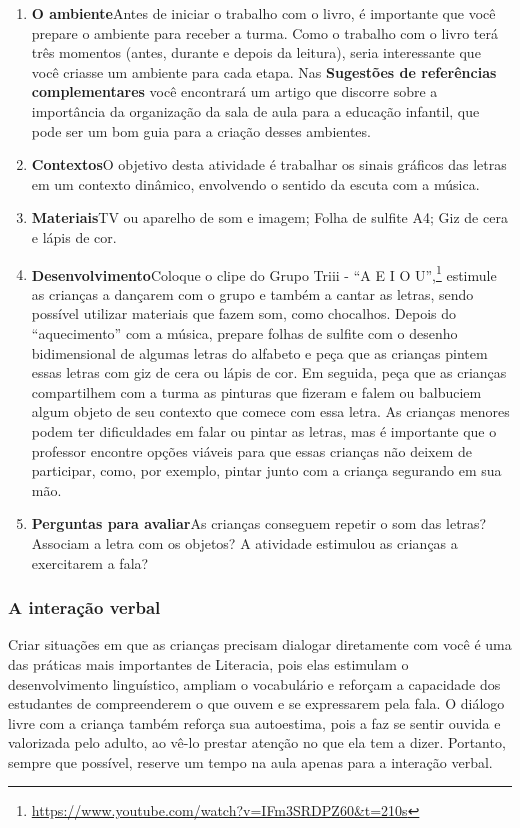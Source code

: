 \documentclass[11pt]{extarticle}
\begin{document}
\begin{enumerate}
\item \textbf{O ambiente}\quad Antes de iniciar o trabalho com o livro, é importante que você 
prepare o ambiente para receber a turma. Como o trabalho com o livro terá 
três momentos (antes, durante e depois da leitura), seria interessante que você 
criasse um ambiente para cada etapa. Nas \textbf{Sugestões de referências complementares} 
você encontrará um artigo que discorre sobre a importância da organização da sala 
de aula para a educação infantil, que pode ser um bom guia para a criação desses 
ambientes.

\item \textbf{Contextos}\quad O objetivo desta atividade é trabalhar os sinais gráficos das letras em um contexto dinâmico, envolvendo o sentido da escuta com a música.

\item \textbf{Materiais}\quad TV ou aparelho de som e imagem; Folha de sulfite A4; Giz de cera e lápis de cor. 

\item \textbf{Desenvolvimento}\quad Coloque o clipe do Grupo Triii - “A E I O U”,\footnote{\url{https://www.youtube.com/watch?v=IFm3SRDPZ60&t=210s}} estimule as crianças a dançarem com o grupo e também a cantar as letras, sendo possível utilizar materiais que fazem som, como chocalhos. Depois do ``aquecimento'' com a música, prepare folhas de sulfite com o desenho bidimensional de algumas letras do alfabeto e peça que as crianças pintem essas letras com giz de cera ou lápis de cor. Em seguida, peça que as crianças compartilhem com a turma as pinturas que fizeram e falem ou balbuciem algum objeto de seu contexto que comece com essa letra. As crianças menores podem ter dificuldades em falar ou pintar as letras, mas é importante que o professor encontre opções viáveis para que essas crianças não deixem de participar, como, por exemplo, pintar junto com a criança segurando em sua mão.

\item \textbf{Perguntas para avaliar}\quad As crianças conseguem repetir o som das letras? Associam a letra com os objetos? A atividade estimulou as crianças a exercitarem a fala?
\end{enumerate}


\subsubsection{A interação verbal} 
Criar situações em que as crianças precisam dialogar diretamente com 
você é uma das práticas mais importantes de Literacia, pois elas estimulam 
o desenvolvimento linguístico, ampliam o vocabulário e reforçam a 
capacidade dos estudantes de compreenderem o que ouvem e se expressarem 
pela fala. O diálogo livre com a criança também reforça sua autoestima, pois 
a faz se sentir ouvida e valorizada pelo adulto, ao vê-lo prestar atenção 
no que ela tem a dizer. Portanto, sempre que possível, reserve um tempo na 
aula apenas para a interação verbal. 
\end{document}
